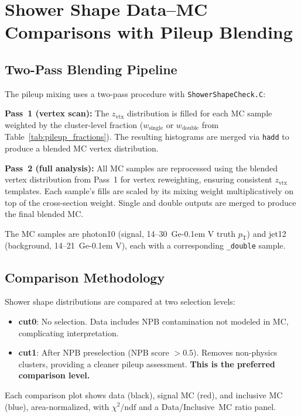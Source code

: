 \documentclass[11pt,a4paper]{article}
\newcommand{\pT}{\ensuremath{p_{\text{T}}}\xspace}
\newcommand{\chidf}{\ensuremath{\chi^2/\mathrm{ndf}}\xspace}
\newcommand{\zvtx}{\ensuremath{z_{\mathrm{vtx}}}\xspace}
\newcommand{\GeV}{\ifmmode {\mathrm{\ Ge\kern -0.1em V}}\else\textrm{Ge\kern -0.1em V}\fi\xspace}
\begin{document}
\section{Shower Shape Data--MC Comparisons with Pileup Blending}
\label{sec:showershape}

\subsection{Two-Pass Blending Pipeline}
\label{subsec:blending}

The pileup mixing uses a two-pass procedure with \texttt{ShowerShapeCheck.C}:

\textbf{Pass~1 (vertex scan):}
The \zvtx distribution is filled for each MC sample weighted by the cluster-level
fraction ($w_{\text{single}}$ or $w_{\text{double}}$ from Table~\ref{tab:pileup_fractions}).
The resulting histograms are merged via \texttt{hadd} to produce a blended MC
vertex distribution.

\textbf{Pass~2 (full analysis):}
All MC samples are reprocessed using the blended vertex distribution from Pass~1
for vertex reweighting, ensuring consistent \zvtx templates.
Each sample's fills are scaled by its mixing weight multiplicatively on top of the
cross-section weight.
Single and double outputs are merged to produce the final blended MC.

The MC samples are photon10 (signal, 14--30~\GeV truth \pT) and jet12
(background, 14--21~\GeV), each with a corresponding \texttt{\_double} sample.

\subsection{Comparison Methodology}
\label{subsec:comparison_method}

Shower shape distributions are compared at two selection levels:
\begin{itemize}
    \item \textbf{cut0}: No selection. Data includes NPB contamination not
      modeled in MC, complicating interpretation.
    \item \textbf{cut1}: After NPB preselection (NPB score $> 0.5$). Removes
      non-physics clusters, providing a cleaner pileup assessment.
      \textbf{This is the preferred comparison level.}
\end{itemize}

Each comparison plot shows data (black), signal MC (red), and inclusive MC (blue),
area-normalized, with \chidf and a Data/Inclusive~MC ratio panel.
\end{document}
